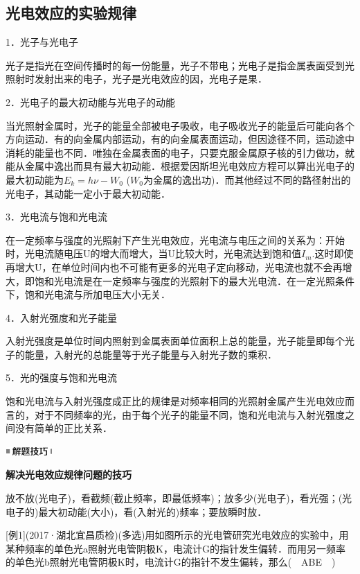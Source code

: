 \newpage
\subsection{光电效应的实验规律}

1．光子与光电子

光子是指光在空间传播时的每一份能量，光子不带电；光电子是指金属表面受到光照射时发射出来的电子，光子是光电效应的因，光电子是果．

2．光电子的最大初动能与光电子的动能

当光照射金属时，光子的能量全部被电子吸收，电子吸收光子的能量后可能向各个方向运动．有的向金属内部运动，有的向金属表面运动，但因途径不同，运动途中消耗的能量也不同．唯独在金属表面的电子，只要克服金属原子核的引力做功，就能从金属中逸出而具有最大初动能．根据爱因斯坦光电效应方程可以算出光电子的最大初动能为$E_k=h\nu-W_0$
($W_0$为金属的逸出功)．而其他经过不同的路径射出的光电子，其动能一定小于最大初动能．

3．光电流与饱和光电流

在一定频率与强度的光照射下产生光电效应，光电流与电压之间的关系为：开始时，光电流随电压U的增大而增大，当U比较大时，光电流达到饱和值$I_m$.这时即使再增大U，在单位时间内也不可能有更多的光电子定向移动，光电流也就不会再增大，即饱和光电流是在一定频率与强度的光照射下的最大光电流．在一定光照条件下，饱和光电流与所加电压大小无关．

4．入射光强度和光子能量

入射光强度是单位时间内照射到金属表面单位面积上总的能量，光子能量即每个光子的能量，入射光的总能量等于光子能量与入射光子数的乘积．

5．光的强度与饱和光电流

饱和光电流与入射光强度成正比的规律是对频率相同的光照射金属产生光电效应而言的，对于不同频率的光，由于每个光子的能量不同，饱和光电流与入射光强度之间没有简单的正比关系．

\begin{center}\includegraphics[width=0.70764in,height=0.12292in]{media/image37.png}\end{center}
\begin{center}
  \textbf{解决光电效应规律问题的技巧}
\end{center}

放不放(光电子)，看截频(截止频率，即最低频率)；放多少(光电子)，看光强；(光电子的)最大初动能(大小)，看(入射光的)频率；要放瞬时放．

{[}例1{]}(2017·湖北宜昌质检)(多选)用如图所示的光电管研究光电效应的实验中，用某种频率的单色光a照射光电管阴极K，电流计G的指针发生偏转．而用另一频率的单色光b照射光电管阴极K时，电流计G的指针不发生偏转，那么(　ABE　)

